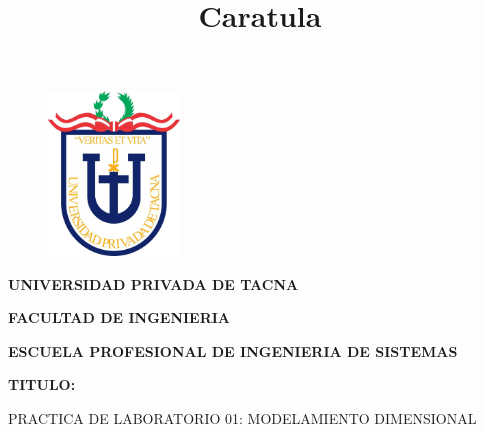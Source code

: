 \documentclass[12pt,letterpaper]{article}
\begin{document}
%

  
\title{Caratula}

\begin{titlepage}
    \begin{center}
    \begin{figure}[htb]
    \begin{center}
    \includegraphics[width=3.5cm]{./img/upt.jpg}
    \end{center}
    \end{figure}
    
    \vspace*{0.15in}
    \begin{Large}
    \textbf{UNIVERSIDAD PRIVADA DE TACNA}\\
    \end{Large}
    
    \vspace*{0.1in}
    \begin{Large}
    \textbf{FACULTAD DE INGENIERIA} \\
    \end{Large}
    
    \vspace*{0.1in}
    \begin{Large}
    \textbf{ESCUELA PROFESIONAL DE INGENIERIA DE SISTEMAS} \\
    \end{Large}
    
    \vspace*{0.5in}
    \begin{Large}
    \textbf{TITULO:}\\
    \end{Large}
    

\vspace*{0.1in}
\begin{Large}
    PRACTICA DE LABORATORIO 01: MODELAMIENTO DIMENSIONAL \\
\end{Large}


\end{center}
\end{titlepage}
\end{document}
